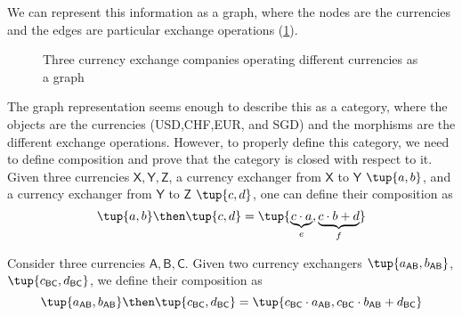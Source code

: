 We can represent this information as a graph, where the nodes are the currencies and the edges are particular exchange operations (\cref{fig:currencygraph}).

\begin{figure}[h]
\begin{center}
\end{center}
\caption{Three currency exchange companies operating different currencies as a graph \label{fig:currencygraph}}
\end{figure}

The graph representation seems enough to describe this as a category, where the objects are the currencies (USD,CHF,EUR, and SGD) and the morphisms are the different exchange operations. However, to properly define this category, we need to define composition and prove that the category is closed with respect to it. Given three currencies $\mathsf{X,Y,Z}$, a currency exchanger from $\mathsf{X}$ to $\mathsf{Y}$ $\tup{a,b}$, and a currency exchanger from $\mathsf{Y}$ to $\mathsf{Z}$ $\tup{c,d}$, one can define their composition as
\begin{equation}
\label{eq:currencycomp}
    \tup{a,b}\then \tup{c,d}=\tup{\underbrace{c\cdot a}_{e},\underbrace{c\cdot b+d}_{f}}
\end{equation}






\begin{definition}
\label{def:compositioncurrency}
Consider three currencies $\mathsf{A,B,C}$. 
Given two currency exchangers $\tup{a_\mathsf{AB},b_\mathsf{AB}}$, $\tup{c_\mathsf{BC},d_\mathsf{BC}}$, we define their composition as
\begin{equation}
\label{eq:currencycomp}
    \tup{a_\mathsf{AB},b_\mathsf{AB}}\then \tup{c_\mathsf{BC},d_\mathsf{BC}}=\tup{c_\mathsf{BC}\cdot a_\mathsf{AB},c_\mathsf{BC}\cdot b_\mathsf{AB}+d_\mathsf{BC}}
\end{equation}
\end{definition}



